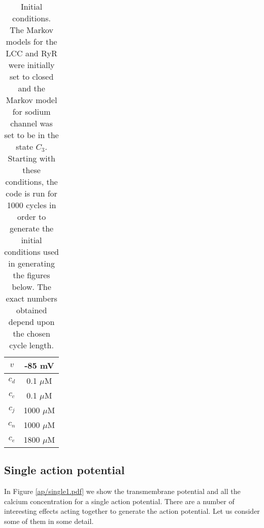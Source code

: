 \begin{table}
\begin{center}
\begin{tabular}{|c|c|} \hline
$v$ & -85 mV \\ \hline
$c_{d}$ & 0.1 $\mu$M \\ \hline
$c_{c}$ & 0.1 $\mu$M \\ \hline
$c_{j}$ & 1000 $\mu$M \\ \hline
$c_{n}$ & 1000 $\mu$M \\ \hline
$c_{e}$ & 1800 $\mu$M \\ \hline
\end{tabular} 
\caption{Initial conditions. The Markov models for the LCC and RyR were initially set to closed and the Markov model for sodium channel was set to be in the state $C_3$. Starting with these conditions, the code is run for 1000 cycles in order to generate the initial conditions used in generating the figures below. The exact numbers obtained depend upon the chosen cycle length. \label{tab:init}}
\end{center}
\end{table}





\subsection{Single action potential}

In Figure \ref{ap/single1.pdf} we show the transmembrane potential and all the calcium concentration for a single action potential. There are a number of interesting effects acting together to generate the action potential. Let us consider some of them in some detail. 



